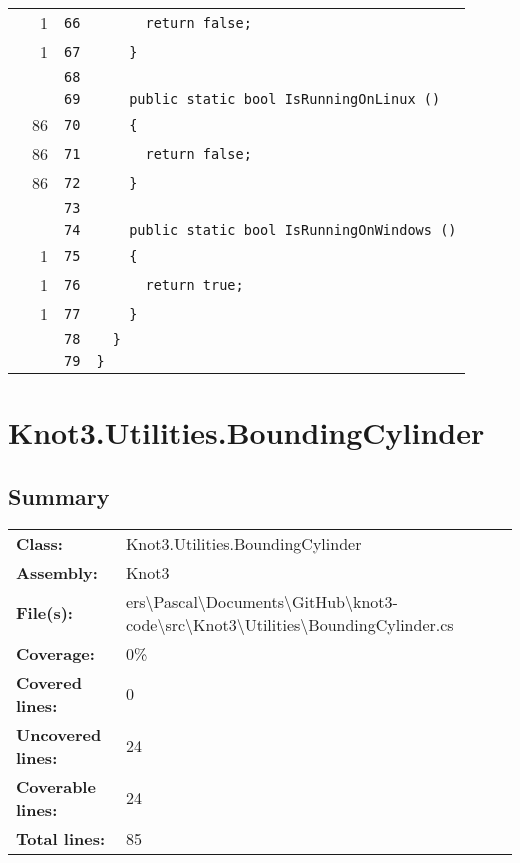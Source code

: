 \documentclass[a4paper,10pt]{article}
\begin{document}
\begin{longtable}[l]{lrrl}
\cellcolor{green} & 1 & \verb~66~ & \verb~      return false;~\\
\cellcolor{green} & 1 & \verb~67~ & \verb~    }~\\
\cellcolor{gray} &  & \verb~68~ & \verb~~\\
\cellcolor{gray} &  & \verb~69~ & \verb~    public static bool IsRunningOnLinux ()~\\
\cellcolor{green} & 86 & \verb~70~ & \verb~    {~\\
\cellcolor{green} & 86 & \verb~71~ & \verb~      return false;~\\
\cellcolor{green} & 86 & \verb~72~ & \verb~    }~\\
\cellcolor{gray} &  & \verb~73~ & \verb~~\\
\cellcolor{gray} &  & \verb~74~ & \verb~    public static bool IsRunningOnWindows ()~\\
\cellcolor{green} & 1 & \verb~75~ & \verb~    {~\\
\cellcolor{green} & 1 & \verb~76~ & \verb~      return true;~\\
\cellcolor{green} & 1 & \verb~77~ & \verb~    }~\\
\cellcolor{gray} &  & \verb~78~ & \verb~  }~\\
\cellcolor{gray} &  & \verb~79~ & \verb~}~\\
\end{longtable}
\newpage
\section{Knot3.Utilities.BoundingCylinder}
\subsection{Summary}
\begin{longtable}[l]{ll}
\textbf{Class:} & Knot3.Utilities.BoundingCylinder\\
\textbf{Assembly:} & Knot3\\
\textbf{File(s):} & \begin{minipage}[t]{12cm}{ers\textbackslash Pascal\textbackslash Documents\textbackslash GitHub\textbackslash knot3-code\textbackslash src\textbackslash Knot3\textbackslash Utilities\textbackslash BoundingCylinder.cs}\end{minipage} \\
\textbf{Coverage:} & 0\%\\
\textbf{Covered lines:} & 0\\
\textbf{Uncovered lines:} & 24\\
\textbf{Coverable lines:} & 24\\
\textbf{Total lines:} & 85\\
\end{longtable}
\end{document}
